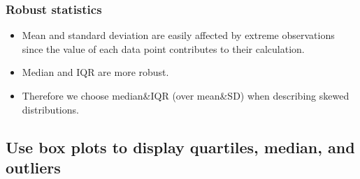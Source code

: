 \documentclass[slidestop,compress,mathserif,12pt,t,professionalfonts,xcolor=table]{beamer}
\begin{document}

\begin{frame}
\frametitle{Robust statistics}

\begin{itemize}

\item Mean and standard deviation are easily affected by extreme observations since the value of each data point contributes to their calculation.

\item Median and IQR are more robust.

\item Therefore we choose median\&IQR (over mean\&SD) when describing skewed distributions.

\end{itemize}

\end{frame}


\begin{frame}
\frametitle{}

\vfill


\vfill

\end{frame}


\subsection{Use box plots to display quartiles, median, and outliers}
\label{mi4}

\end{document}
